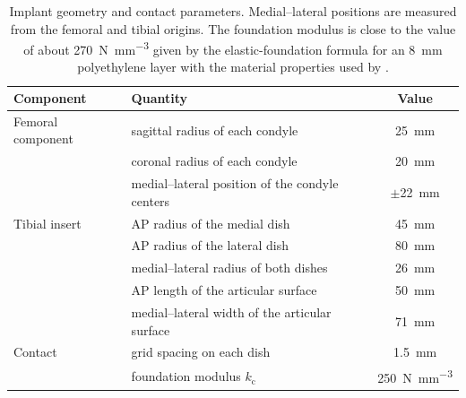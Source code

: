 \begin{table}[H]
\centering
\caption{Implant geometry and contact parameters.
Medial--lateral positions are measured from the femoral and tibial origins.
The foundation modulus is close to the value of about \SI{270}{\newton\per\cubic\milli\meter} given by the elastic-foundation formula for an \SI{8}{\milli\meter} polyethylene layer with the material properties used by \textcite{bei2004multibody}.}
\label{tab:implant}
\begin{tabular}{llc}
\toprule
Component & Quantity & Value\\
\midrule
Femoral component & sagittal radius of each condyle & \SI{25}{\milli\meter}\\
 & coronal radius of each condyle & \SI{20}{\milli\meter}\\
 & medial--lateral position of the condyle centers & $\pm$\SI{22}{\milli\meter}\\
Tibial insert & AP radius of the medial dish & \SI{45}{\milli\meter}\\
 & AP radius of the lateral dish & \SI{80}{\milli\meter}\\
 & medial--lateral radius of both dishes & \SI{26}{\milli\meter}\\
 & AP length of the articular surface & \SI{50}{\milli\meter}\\
 & medial--lateral width of the articular surface & \SI{71}{\milli\meter}\\
Contact & grid spacing on each dish & \SI{1.5}{\milli\meter}\\
 & foundation modulus $k_\mathrm{c}$ & \SI{250}{\newton\per\cubic\milli\meter}\\
\bottomrule
\end{tabular}
\end{table}
